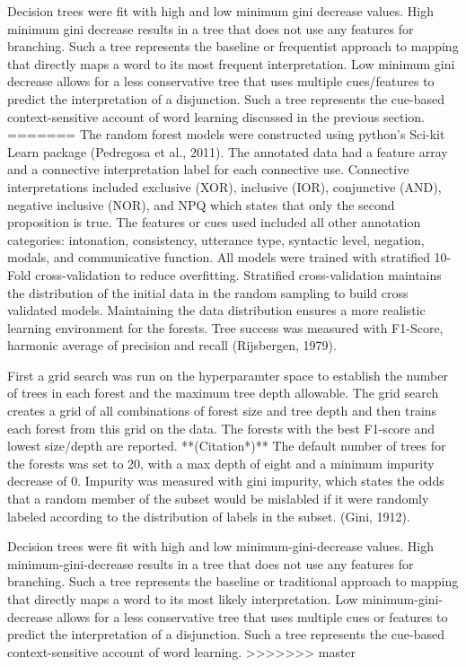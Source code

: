 \documentclass[,man,floatsintext]{apa6}
\begin{document}
Decision trees were fit with high and low minimum gini decrease values. High minimum gini decrease results in a tree that does not use any features for branching. Such a tree represents the baseline or frequentist approach to mapping that directly maps a word to its most frequent interpretation. Low minimum gini decrease allows for a less conservative tree that uses multiple cues/features to predict the interpretation of a disjunction. Such a tree represents the cue-based context-sensitive account of word learning discussed in the previous section.
=======
The random forest models were constructed using python's Sci-kit Learn package (Pedregosa et al., 2011). The annotated data had a feature array and a connective interpretation label for each connective use. Connective interpretations included exclusive (XOR), inclusive (IOR), conjunctive (AND), negative inclusive (NOR), and NPQ which states that only the second proposition is true. The features or cues used included all other annotation categories: intonation, consistency, utterance type, syntactic level, negation, modals, and communicative function. All models were trained with stratified 10-Fold cross-validation to reduce overfitting. Stratified cross-validation maintains the distribution of the initial data in the random sampling to build cross validated models. Maintaining the data distribution ensures a more realistic learning environment for the forests. Tree success was measured with F1-Score, harmonic average of precision and recall (Rijsbergen, 1979).

First a grid search was run on the hyperparamter space to establish the number of trees in each forest and the maximum tree depth allowable. The grid search creates a grid of all combinations of forest size and tree depth and then trains each forest from this grid on the data. The forests with the best F1-score and lowest size/depth are reported. **(Citation*)** The default number of trees for the forests was set to 20, with a max depth of eight and a minimum impurity decrease of 0. Impurity was measured with gini impurity, which states the odds that a random member of the subset would be mislabled if it were randomly labeled according to the distribution of labels in the subset. (Gini, 1912).

Decision trees were fit with high and low minimum-gini-decrease values. High minimum-gini-decrease results in a tree that does not use any features for branching. Such a tree represents the baseline or traditional approach to mapping that directly maps a word to its most likely interpretation. Low minimum-gini-decrease allows for a less conservative tree that uses multiple cues or features to predict the interpretation of a disjunction. Such a tree represents the cue-based context-sensitive account of word learning.
>>>>>>> master
\end{document}
